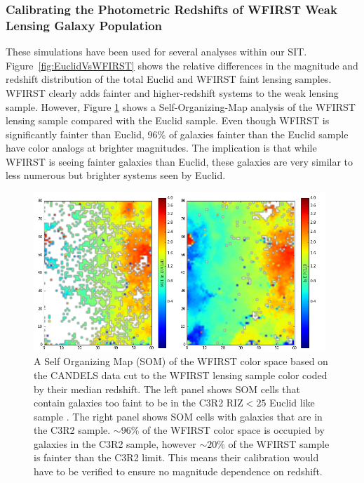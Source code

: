 \subsubsection{Calibrating the Photometric Redshifts of WFIRST Weak Lensing Galaxy Population}

These simulations have been used for several analyses within our SIT.  Figure~\ref{fig:EuclidVsWFIRST} shows the relative differences in the magnitude and
redshift distribution of the total Euclid and WFIRST faint lensing samples.
WFIRST clearly adds fainter and higher-redshift systems to the weak lensing
sample.  However, Figure \ref{fig:WFIRSTSOM} shows a Self-Organizing-Map
analysis \citep{Masters2015} of the WFIRST lensing sample compared with the
Euclid sample. Even though WFIRST is significantly fainter than Euclid, 96\% of
galaxies fainter than the Euclid sample have color analogs at brighter
magnitudes.  The implication is that while WFIRST is seeing fainter galaxies
than Euclid, these galaxies are very similar to less numerous but brighter
systems seen by Euclid.

\begin{figure}
\centering
 \includegraphics[trim=0cm 0cm 0cm 0cm, clip,width=0.98\textwidth] {./plots/SOM_WFIRST_EUCLID.png}
\caption{A Self Organizing Map (SOM) \citep{Masters2015} of the WFIRST color
space based on the CANDELS data cut to the WFIRST lensing sample color coded by
their median redshift.  The left panel shows SOM cells that contain galaxies too
faint to be in the C3R2 RIZ$<25$ Euclid like sample
\citep{Masters2015,Masters2017}.  The right panel shows SOM cells with galaxies
that are in the C3R2 sample.  $\sim96\%$ of the WFIRST color space is occupied
by galaxies in the C3R2 sample, however $\sim20\%$ of the WFIRST sample is
fainter than the C3R2 limit.  This means their calibration would have to be
verified to ensure no magnitude dependence on redshift. }
\label{fig:WFIRSTSOM}
\end{figure}

